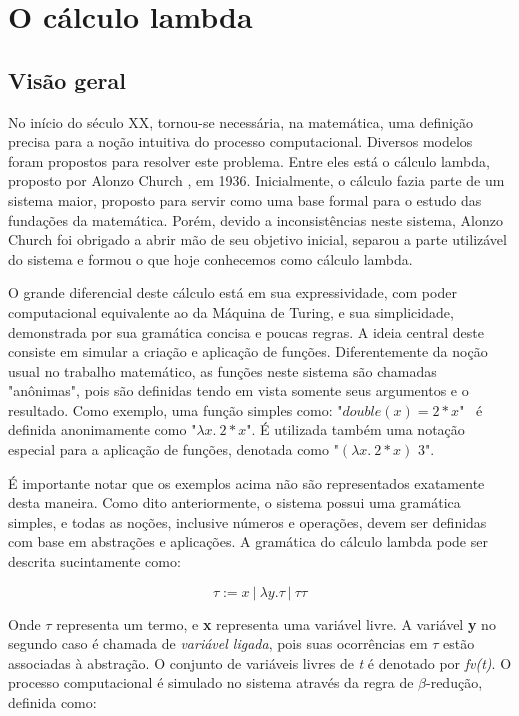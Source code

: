 \section{O cálculo lambda}

\subsection{Visão geral}

No início do século XX, tornou-se necessária, na matemática, uma definição 
precisa para a noção intuitiva do processo computacional. Diversos modelos foram
propostos para resolver este problema. Entre eles está o cálculo lambda,
proposto por Alonzo Church \cite{lambda_first}, em 1936. Inicialmente, o cálculo
fazia parte de um sistema maior, proposto para servir como uma base
formal para o estudo das fundações da matemática. Porém, devido a
inconsistências neste sistema, Alonzo Church foi obrigado a abrir mão de seu
objetivo inicial, separou a parte utilizável do sistema e formou o que hoje
conhecemos como cálculo lambda.

O grande diferencial deste cálculo está em sua expressividade, com poder
computacional equivalente ao da Máquina de Turing, e sua simplicidade,
demonstrada por sua gramática concisa e poucas regras. A ideia central deste
consiste em simular a criação e aplicação de funções. Diferentemente da noção
usual no trabalho matemático, as funções neste sistema são chamadas "anônimas",
pois são definidas tendo em vista somente seus argumentos e o resultado. Como
exemplo, uma função simples como: "$double(x) = 2*x$" \ é definida anonimamente como
"$\lambda x.\ 2*x$". É utilizada também uma notação especial para a aplicação de
funções, denotada como "$ (\lambda x.\ 2*x)$  $3$".

É importante notar que os exemplos acima não são representados exatamente desta
maneira. Como dito anteriormente, o sistema possui uma gramática simples, e
todas as noções, inclusive números e operações, devem ser definidas com base em
abstrações e aplicações. A gramática do cálculo lambda pode ser descrita
sucintamente como:

\[ \tau := x\ |\ \lambda y.\tau\ |\ \tau \tau \]

Onde $\tau$ representa um termo, e \textbf{x} representa uma variável livre. A
variável \textbf{y} no segundo caso é chamada de \textit{variável ligada},
pois suas ocorrências em $\tau$ estão associadas à abstração. 
O conjunto de variáveis livres de \emph{t} é denotado por \emph{fv(t)}. O processo
computacional é simulado no sistema através da regra de $\beta$-redução,
definida como:

